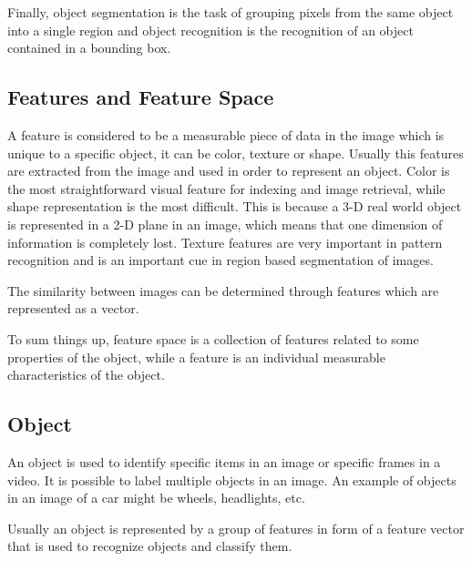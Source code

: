     \par Finally, object segmentation is the task of grouping pixels from the same object into a single region and object recognition is the recognition of an object contained in a bounding box.  \cite{Agarwal2019}

    \subsection{Features and Feature Space }
    \label{sec:featurespace}
    \par A feature is considered to be a measurable piece of data in the image which is unique to a specific object, it can be color, texture or shape. Usually this features are extracted from the image and used in order to represent an object. Color is the most straightforward visual feature for indexing and image retrieval, while shape representation is the most difficult. This is because a 3-D real world object is represented in a 2-D plane in an image, which means that one dimension of information is completely lost. Texture features are very important in pattern recognition and is an important cue in region based segmentation of images.

    \par The similarity between images can be determined through features which are represented as a vector. 

    \par To sum things up, feature space is a collection of features related to some properties of the object, while a feature is an individual measurable characteristics of the object. \cite{Tiwari2013}

    \subsection{Object}

 
    \par An object is used to identify specific items in an image or specific frames in a video. It is possible to label multiple objects in an image. An example of objects in an image of a car might be wheels, headlights, etc.
    \par Usually an object is represented by a group of features in form of a feature vector that is used to recognize objects and classify them. \cite{Tiwari2013}

